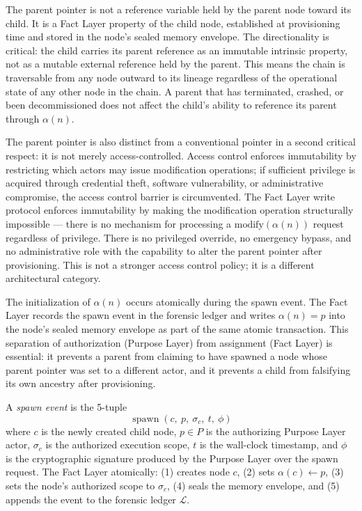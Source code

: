 The parent pointer is not a reference variable held by the parent node toward its child. It is a Fact Layer property of the child node, established at provisioning time and stored in the node's sealed memory envelope. The directionality is critical: the child carries its parent reference as an immutable intrinsic property, not as a mutable external reference held by the parent. This means the chain is traversable from any node outward to its lineage regardless of the operational state of any other node in the chain. A parent that has terminated, crashed, or been decommissioned does not affect the child's ability to reference its parent through $\alpha(n)$.

The parent pointer is also distinct from a conventional pointer in a second critical respect: it is not merely access-controlled. Access control enforces immutability by restricting which actors may issue modification operations; if sufficient privilege is acquired through credential theft, software vulnerability, or administrative compromise, the access control barrier is circumvented. The Fact Layer write protocol enforces immutability by making the modification operation structurally impossible --- there is no mechanism for processing a $\text{modify}(\alpha(n))$ request regardless of privilege. There is no privileged override, no emergency bypass, and no administrative role with the capability to alter the parent pointer after provisioning. This is not a stronger access control policy; it is a different architectural category.

The initialization of $\alpha(n)$ occurs atomically during the spawn event. The Fact Layer records the spawn event in the forensic ledger and writes $\alpha(n) = p$ into the node's sealed memory envelope as part of the same atomic transaction. This separation of authorization (Purpose Layer) from assignment (Fact Layer) is essential: it prevents a parent from claiming to have spawned a node whose parent pointer was set to a different actor, and it prevents a child from falsifying its own ancestry after provisioning.

\begin{dfn}
\label{dfn:spawn-event}
A \emph{spawn event} is the 5-tuple
\begin{equation}
\operatorname{spawn}(c,\ p,\ \sigma_c,\ t,\ \phi)
\end{equation}
where $c$ is the newly created child node, $p \in P$ is the authorizing Purpose Layer actor, $\sigma_c$ is the authorized execution scope, $t$ is the wall-clock timestamp, and $\phi$ is the cryptographic signature produced by the Purpose Layer over the spawn request. The Fact Layer atomically: (1) creates node $c$, (2) sets $\alpha(c) \leftarrow p$, (3) sets the node's authorized scope to $\sigma_c$, (4) seals the memory envelope, and (5) appends the event to the forensic ledger $\mathcal{L}$.
\end{dfn}

